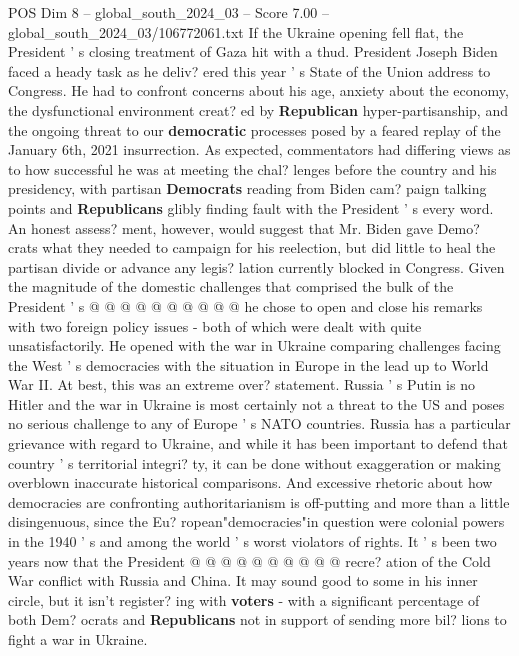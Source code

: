\begin{textsample}{POS Dim 8 – global\_south\_2024\_03 – Score 7.00 – global\_south\_2024\_03/106772061.txt}  \label{ex:f8_pos_100}
If the Ukraine opening fell flat, the President ' s closing treatment of Gaza hit with a thud.
President Joseph Biden faced a heady task as he deliv? ered this year ' s State of the Union address to Congress.
He had to confront concerns about his age, anxiety about the economy, the dysfunctional environment creat? ed by \textbf{Republican} hyper-partisanship, and the ongoing threat to our \textbf{democratic} processes posed by a feared replay of the January 6th, 2021 insurrection.
As expected, commentators had differing views as to how successful he was at meeting the chal? lenges before the country and his presidency, with partisan \textbf{Democrats} reading from Biden cam? paign talking points and \textbf{Republicans} glibly finding fault with the President ' s every word.
An honest assess? ment, however, would suggest that Mr.
Biden gave Demo? crats what they needed to campaign for his reelection, but did little to heal the partisan divide or advance any legis? lation currently blocked in Congress.
Given the magnitude of the domestic challenges that comprised the bulk of the President ' s @ @ @ @ @ @ @ @ @ @ he chose to open and close his remarks with two foreign policy issues - both of which were dealt with quite unsatisfactorily.
He opened with the war in Ukraine comparing challenges facing the West ' s democracies with the situation in Europe in the lead up to World War II.
At best, this was an extreme over? statement.
Russia ' s Putin is no Hitler and the war in Ukraine is most certainly not a threat to the US and poses no serious challenge to any of Europe ' s NATO countries.
Russia has a particular grievance with regard to Ukraine, and while it has been important to defend that country ' s territorial integri? ty, it can be done without exaggeration or making overblown inaccurate historical comparisons.
And excessive rhetoric about how democracies are confronting authoritarianism is off-putting and more than a little disingenuous, since the Eu? ropean"democracies"in question were colonial powers in the 1940 ' s and among the world ' s worst violators of rights.
It ' s been two years now that the President @ @ @ @ @ @ @ @ @ @ recre? ation of the Cold War conflict with Russia and China.
It may sound good to some in his inner circle, but it isn't register? ing with \textbf{voters} - with a significant percentage of both Dem? ocrats and \textbf{Republicans} not in support of sending more bil? lions to fight a war in Ukraine.

\end{textsample}
